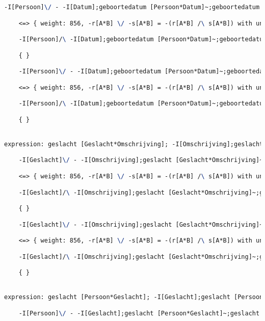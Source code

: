 \begin{lstlisting}[language=TeX]
    -I[Persoon]\/ - -I[Datum];geboortedatum [Persoon*Datum]~;geboortedatum [Persoon*Datum]

    <=> { weight: 856, -r[A*B] \/ -s[A*B] = -(r[A*B] /\ s[A*B]) with unifier: {A->I[Persoon], B->I[Persoon], r->geboortedatum [Persoon*Datum];-I[Datum];geboortedatum [Persoon*Datum]~, s->I[Persoon]} }

    -I[Persoon]/\ -I[Datum];geboortedatum [Persoon*Datum]~;geboortedatum [Persoon*Datum]

    { }

    -I[Persoon]\/ - -I[Datum];geboortedatum [Persoon*Datum]~;geboortedatum [Persoon*Datum]

    <=> { weight: 856, -r[A*B] \/ -s[A*B] = -(r[A*B] /\ s[A*B]) with unifier: {A->I[Persoon], B->I[Persoon], r->I[Persoon], s->geboortedatum [Persoon*Datum];-I[Datum];geboortedatum [Persoon*Datum]~} }

    -I[Persoon]/\ -I[Datum];geboortedatum [Persoon*Datum]~;geboortedatum [Persoon*Datum]

    { }


expression: geslacht [Geslacht*Omschrijving]; -I[Omschrijving];geslacht [Geslacht*Omschrijving]~ |- -I[Geslacht]

    -I[Geslacht]\/ - -I[Omschrijving];geslacht [Geslacht*Omschrijving]~;geslacht [Geslacht*Omschrijving]

    <=> { weight: 856, -r[A*B] \/ -s[A*B] = -(r[A*B] /\ s[A*B]) with unifier: {A->I[Geslacht], B->I[Geslacht], r->geslacht [Geslacht*Omschrijving];-I[Omschrijving];geslacht [Geslacht*Omschrijving]~, s->I[Geslacht]} }

    -I[Geslacht]/\ -I[Omschrijving];geslacht [Geslacht*Omschrijving]~;geslacht [Geslacht*Omschrijving]

    { }

    -I[Geslacht]\/ - -I[Omschrijving];geslacht [Geslacht*Omschrijving]~;geslacht [Geslacht*Omschrijving]

    <=> { weight: 856, -r[A*B] \/ -s[A*B] = -(r[A*B] /\ s[A*B]) with unifier: {A->I[Geslacht], B->I[Geslacht], r->I[Geslacht], s->geslacht [Geslacht*Omschrijving];-I[Omschrijving];geslacht [Geslacht*Omschrijving]~} }

    -I[Geslacht]/\ -I[Omschrijving];geslacht [Geslacht*Omschrijving]~;geslacht [Geslacht*Omschrijving]

    { }


expression: geslacht [Persoon*Geslacht]; -I[Geslacht];geslacht [Persoon*Geslacht]~ |- -I[Persoon]

    -I[Persoon]\/ - -I[Geslacht];geslacht [Persoon*Geslacht]~;geslacht [Persoon*Geslacht]


\end{lstlisting}
